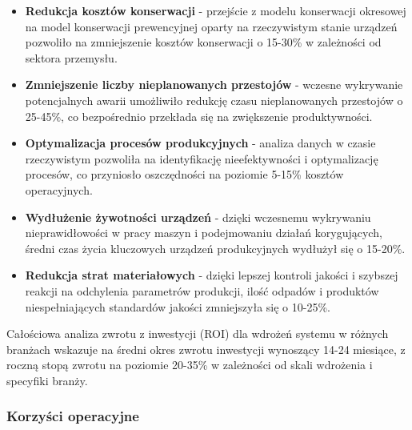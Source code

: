 \begin{itemize}
    \item \textbf{Redukcja kosztów konserwacji} - przejście z modelu konserwacji okresowej na model konserwacji prewencyjnej oparty na rzeczywistym stanie urządzeń pozwoliło na zmniejszenie kosztów konserwacji o 15-30\% w zależności od sektora przemysłu.
    \item \textbf{Zmniejszenie liczby nieplanowanych przestojów} - wczesne wykrywanie potencjalnych awarii umożliwiło redukcję czasu nieplanowanych przestojów o 25-45\%, co bezpośrednio przekłada się na zwiększenie produktywności.
    \item \textbf{Optymalizacja procesów produkcyjnych} - analiza danych w czasie rzeczywistym pozwoliła na identyfikację nieefektywności i optymalizację procesów, co przyniosło oszczędności na poziomie 5-15\% kosztów operacyjnych.
    \item \textbf{Wydłużenie żywotności urządzeń} - dzięki wczesnemu wykrywaniu nieprawidłowości w pracy maszyn i podejmowaniu działań korygujących, średni czas życia kluczowych urządzeń produkcyjnych wydłużył się o 15-20\%.
    \item \textbf{Redukcja strat materiałowych} - dzięki lepszej kontroli jakości i szybszej reakcji na odchylenia parametrów produkcji, ilość odpadów i produktów niespełniających standardów jakości zmniejszyła się o 10-25\%.
\end{itemize}

Całościowa analiza zwrotu z inwestycji (ROI) dla wdrożeń systemu w różnych branżach wskazuje na średni okres zwrotu inwestycji wynoszący 14-24 miesiące, z roczną stopą zwrotu na poziomie 20-35\% w zależności od skali wdrożenia i specyfiki branży.

\subsubsection{Korzyści operacyjne}
\label{subsubsec:korzysci_operacyjne}

